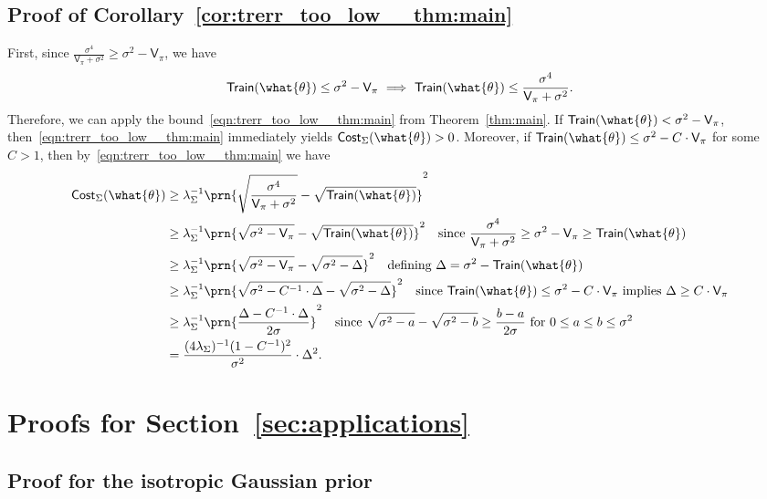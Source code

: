 \documentclass[11pt]{article}
\newcommand{\trerr}{\mathsf{Train}}
\newcommand{\cost}{\mathsf{Cost}}
\begin{document}
\subsection{Proof of Corollary~\ref{cor:trerr_too_low__thm:main}}
First, since $\frac{\sigma^4}{\mathsf{V}_\pi+\sigma^2} \geq \sigma^2 -  \mathsf{V}_\pi$,
we have
\[\trerr(\what{\theta}) \leq \sigma^2 - \mathsf{V}_\pi\ \Longrightarrow \ \trerr(\what{\theta})\leq \frac{\sigma^4}{\mathsf{V}_\pi+\sigma^2}.\]
Therefore, we can apply the bound~\eqref{eqn:trerr_too_low__thm:main} from Theorem~\ref{thm:main}. If $\trerr(\what{\theta}) <\sigma^2 -  \mathsf{V}_\pi$, then~\eqref{eqn:trerr_too_low__thm:main} immediately yields $\cost_\Sigma(\what{\theta})>0$. Moreover, if 
$\trerr(\what{\theta}) \leq \sigma^2 -  C\cdot \mathsf{V}_\pi$ for some $C>1$, then by~\eqref{eqn:trerr_too_low__thm:main} we have
\begin{align*}
    \cost_\Sigma(\what{\theta})
    &\geq \lambda_\Sigma^{-1}\prn{\sqrt{\frac{\sigma^4}{\mathsf{V}_\pi+\sigma^2}} - \sqrt{\trerr(\what{\theta})}}^2\\
    &\geq \lambda_\Sigma^{-1}\prn{\sqrt{\sigma^2 - \mathsf{V}_\pi} - \sqrt{\trerr(\what{\theta})}}^2\textnormal{\quad since $\frac{\sigma^4}{\mathsf{V}_\pi+\sigma^2} \geq \sigma^2 -  \mathsf{V}_\pi\geq \trerr(\what{\theta})$}\\
    &\geq \lambda_\Sigma^{-1}\prn{\sqrt{\sigma^2 - \mathsf{V}_\pi} - \sqrt{\sigma^2-\Delta}}^2\textnormal{\quad defining $\Delta = \sigma^2 - \trerr(\what{\theta})$}\\
    &\geq \lambda_\Sigma^{-1}\prn{\sqrt{\sigma^2 - C^{-1}\cdot \Delta} - \sqrt{\sigma^2 - \Delta}}^2\textnormal{\quad since $\trerr(\what{\theta}) \leq \sigma^2 -  C\cdot \mathsf{V}_\pi$ implies $\Delta\geq C\cdot \mathsf{V}_\pi$}\\
    &\geq \lambda_\Sigma^{-1}\prn{\frac{\Delta - C^{-1}\cdot \Delta}{2\sigma}}^2\textnormal{\quad since $\sqrt{\sigma^2-a} - \sqrt{\sigma^2-b} \geq \frac{b-a}{2\sigma}$ for $0\leq a\leq b\leq \sigma^2$}\\
    &=\frac{(4\lambda_\Sigma)^{-1}(1-C^{-1})^2}{\sigma^2} \cdot \Delta^2.
\end{align*}

\section{Proofs for Section~\ref{sec:applications}} \label{sec:proof-applications}

\subsection{Proof for the isotropic Gaussian prior} \label{proof:applications-isotropic}
\end{document}
